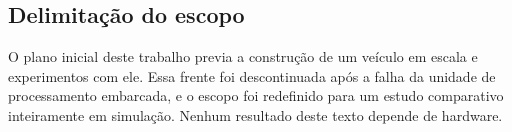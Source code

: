 \subsection*{Delimitação do escopo}

O plano inicial deste trabalho previa a construção de um veículo em escala e
experimentos com ele. Essa frente foi descontinuada após a falha da unidade de
processamento embarcada, e o escopo foi redefinido para um estudo comparativo
inteiramente em simulação. Nenhum resultado deste texto depende de hardware.

